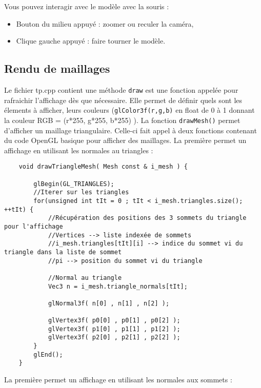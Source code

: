 \documentclass[a4paper,10pt]{tp_um}
\newcommand\code[1]{\texttt{#1}}
\begin{document}
Vous pouvez interagir avec le modèle avec la souris :
\begin{itemize}
 \item Bouton du milieu appuyé : zoomer ou reculer la caméra,
 \item Clique gauche appuyé : faire tourner le modèle.
\end{itemize}

 \subsection{Rendu de maillages}
 
Le fichier tp.cpp contient une m\'ethode \code{draw} est une fonction appelée pour rafraichir l'affichage dès que nécessaire. Elle permet de définir quels sont les élements à afficher, leurs couleurs (\code{glColor3f(r,g,b)} en float de 0 à 1 donnant la couleur RGB = (r*255, g*255, b*255) ). La fonction \code{drawMesh()} permet d'afficher un maillage triangulaire.
Celle-ci fait appel à deux fonctions contenant du code OpenGL basique pour afficher des maillages. 
La première permet un affichage en utilisant les normales au triangles : 
\begin{verbatim}
    void drawTriangleMesh( Mesh const & i_mesh ) {
        
        glBegin(GL_TRIANGLES);
        //Iterer sur les triangles
        for(unsigned int tIt = 0 ; tIt < i_mesh.triangles.size(); ++tIt) {
            //Récupération des positions des 3 sommets du triangle pour l'affichage
            //Vertices --> liste indexée de sommets 
            //i_mesh.triangles[tIt][i] --> indice du sommet vi du triangle dans la liste de sommet 
            //pi --> position du sommet vi du triangle
            
            //Normal au triangle
            Vec3 n = i_mesh.triangle_normals[tIt];

            glNormal3f( n[0] , n[1] , n[2] );

            glVertex3f( p0[0] , p0[1] , p0[2] );
            glVertex3f( p1[0] , p1[1] , p1[2] );
            glVertex3f( p2[0] , p2[1] , p2[2] );
        }
        glEnd();
    }
 \end{verbatim}
La première permet un affichage en utilisant les normales aux sommets :  
\end{document}
